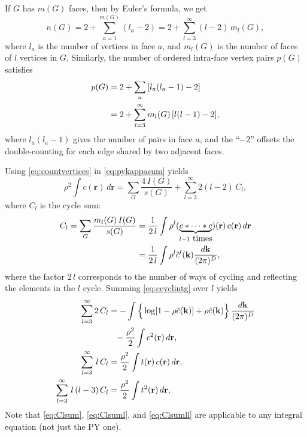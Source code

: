 \documentclass[aip,jcp,reprint,superscriptaddress]{revtex4-1}
\newcommand{\vct}[1]{\mathbf{#1}}
\providecommand{\vr}{} %
\renewcommand{\vr}{\vct{r}}
\newcommand{\vk}{\vct{k}}
\newcommand{\dvk}{\frac{d\vk}{(2\pi)^D}}
\begin{document}
If $G$ has $m(G)$ faces, then by Euler's formula, we get
%
\begin{equation}
  n(G) = 2 + \sum_{a = 1}^{m(G)} (l_a - 2)
       = 2 + \sum_{l = 3}^\infty (l - 2) \, m_l(G),
\label{eq:countvertices}
\end{equation}
%
where
  $l_a$ is the number of vertices in face $a$,
%
and
  $m_l(G)$ is the number of faces of $l$ vertices in $G$.
%
Similarly, the number of ordered intra-face vertex pairs
  $p(G)$ satisfies
%
\begin{align}
  p(G)  &= 2 + \sum_{a} \left[ l_a (l_a - 1) - 2 \right]
                        \notag \\
        &= 2 + \sum_{l = 3}^\infty m_l(G) \, [l(l-1) - 2],
\label{eq:countpairs}
\end{align}
%
where $l_a (l_a - 1)$ gives the number of pairs in face $a$,
  and the ``$-2$'' %
  offsets the double-counting
  for each edge shared by two adjacent faces.






Using \eqref{eq:countvertices} in \eqref{eq:pykappasum} yields
%
\begin{equation}
    \rho^2 \int c(\vr) \, d\vr
  = \sum_G \frac{ 4 \, I(G) }{ s(G) }
  + \sum_{l = 3}^\infty 2 (l - 2) \, C_l,
\label{eq:pyintgcr2sums}
\end{equation}
%
where $C_l$ is the cycle sum:
%
\begin{align}
      C_l
  =  \sum_G \frac{ m_l(G) \, I(G) } { s(G) }
  &=  \frac{1}{2 \, l}
      \int \rho^l (\underbrace{c*\cdots *c}_{l-1 \mbox{ times}})(\vr)
                        \, c(\vr) \, d\vr
      \notag \\
  &=  \frac{1}{2 \, l}
      \int \rho^l \tilde{c}^l(\vk) \dvk,
\label{eq:ccyclintg}
\end{align}
%
where the factor $2 \, l$ corresponds to the number of ways
  of cycling and reflecting the elements in the $l$ cycle.
%
Summing \eqref{eq:ccyclintg} over $l$ yields
%
\begin{align}
     \sum_{l=3}^{\infty} 2 \, C_l
  &= -\int \Big\{
              \log[ 1 - \rho \tilde{c}(\vk) ]
            + \rho \tilde{c}(\vk)
           \Big\}\, \dvk \notag \\
  & \hphantom{=}
     - \frac{\rho^2}{2} \int c^2(\vr) \, d\vr,
     \label{eq:Clsum} \\
      \sum_{l=3}^{\infty} \, l \, C_l
  &=
      \frac{ \rho^2 }{2} \int t(\vr) \, c(\vr) \, d\vr,
      \label{eq:Clsuml} \\
      \sum_{l=3}^{\infty} \, l \, (l - 3) \, C_l
  &=  \frac{ \rho^2 }{ 2 }
      \int t^2(\vr) \, d\vr,
\label{eq:Clsumll}
\end{align}
%
Note that \eqref{eq:Clsum}, \eqref{eq:Clsuml}, and \eqref{eq:Clsumll}
  are applicable to any integral equation (not just the PY one).
\end{document}

